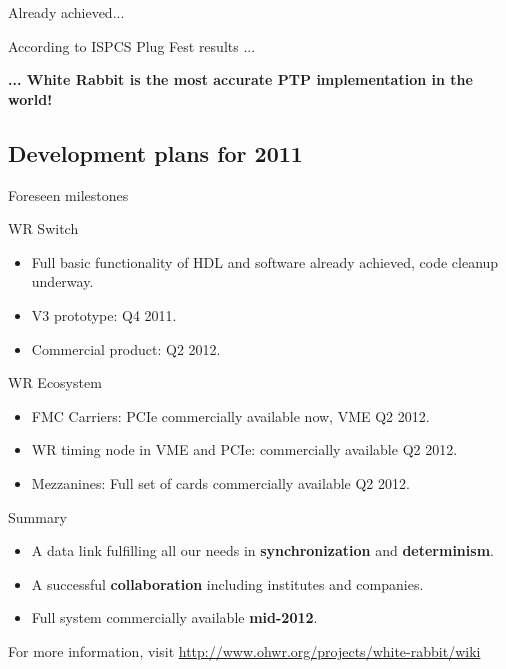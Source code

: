 \documentclass[compress,red]{beamer}
\begin{document}
\begin{frame}{Already achieved...}
  \begin{block}{According to ISPCS Plug Fest results ...}
    \begin{center}
      \textbf{... White Rabbit is the most accurate PTP implementation in the world!}
  \end{center}
  \end{block}
\end{frame}

\subsection{Development plans for 2011}


\begin{frame}{Foreseen milestones}

  \begin{block}{WR Switch}
    \begin{itemize} 
      \item Full basic functionality of HDL and software already achieved, code cleanup underway.
      \item V3 prototype: Q4 2011.
      \item Commercial product: Q2 2012.
      \end{itemize}
    \end{block}

  \begin{block}{WR Ecosystem}
    \begin{itemize} 
      \item FMC Carriers: PCIe commercially available now, VME Q2 2012.
      \item WR timing node in VME and PCIe: commercially available Q2 2012.
      \item Mezzanines: Full set of cards commercially available Q2 2012. 
      \end{itemize}
    \end{block}

\end{frame}


\begin{frame}{Summary}
  \begin{itemize}
  \item
    A data link fulfilling all our needs in \textbf{synchronization} and \textbf{determinism}.
  \item
    A successful \textbf{collaboration} including institutes and companies.
  \item
    Full system commercially available \textbf{mid-2012}.
  \end{itemize}
  \vspace{10mm}
  \begin{center}
  For more information, visit \href{http://www.ohwr.org/projects/white-rabbit/wiki}{http://www.ohwr.org/projects/white-rabbit/wiki}    
  \end{center}
\end{frame}
\end{document}
